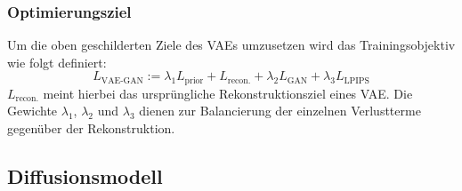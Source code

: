 \subsubsection {Optimierungsziel}
\label{subsubsec:vae_optim}

Um die oben geschilderten Ziele des \ac{VAE}s umzusetzen wird das Trainingsobjektiv wie folgt definiert:
\begin{equation}
    L_\text{VAE-GAN} := \lambda_1 L_\text{prior} + L_\text{recon.} + \lambda_2  L_\text{GAN} + \lambda_3 L_\text{LPIPS}  
\end{equation}
$L_\text{recon.}$ meint hierbei das ursprüngliche Rekonstruktionsziel eines \ac{VAE}. Die Gewichte $\lambda_1$, $\lambda_2$ und $\lambda_3$ dienen zur Balancierung der einzelnen Verlustterme gegenüber der Rekonstruktion. 

\subsection {Diffusionsmodell}

